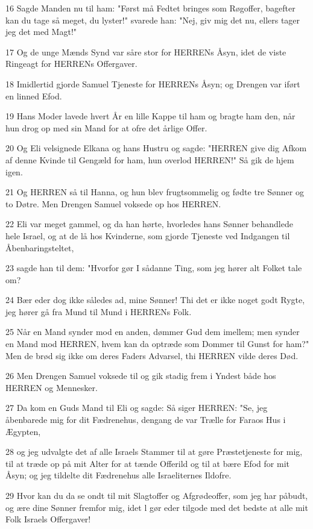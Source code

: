 \par 16 Sagde Manden nu til ham: "Først må Fedtet bringes som Røgoffer, bagefter kan du tage så meget, du lyster!" svarede han: "Nej, giv mig det nu, ellers tager jeg det med Magt!"
\par 17 Og de unge Mænds Synd var såre stor for HERRENs Åsyn, idet de viste Ringeagt for HERRENs Offergaver.
\par 18 Imidlertid gjorde Samuel Tjeneste for HERRENs Åsyn; og Drengen var iført en linned Efod.
\par 19 Hans Moder lavede hvert År en lille Kappe til ham og bragte ham den, når hun drog op med sin Mand for at ofre det årlige Offer.
\par 20 Og Eli velsignede Elkana og hans Hustru og sagde: "HERREN give dig Afkom af denne Kvinde til Gengæld for ham, hun overlod HERREN!" Så gik de hjem igen.
\par 21 Og HERREN så til Hanna, og hun blev frugtsommelig og fødte tre Sønner og to Døtre. Men Drengen Samuel voksede op hos HERREN.
\par 22 Eli var meget gammel, og da han hørte, hvorledes hans Sønner behandlede hele Israel, og at de lå hos Kvinderne, som gjorde Tjeneste ved Indgangen til Åbenbaringsteltet,
\par 23 sagde han til dem: "Hvorfor gør I sådanne Ting, som jeg hører alt Folket tale om?
\par 24 Bær eder dog ikke således ad, mine Sønner! Thi det er ikke noget godt Rygte, jeg hører gå fra Mund til Mund i HERRENs Folk.
\par 25 Når en Mand synder mod en anden, dømmer Gud dem imellem; men synder en Mand mod HERREN, hvem kan da optræde som Dommer til Gunst for ham?" Men de brød sig ikke om deres Faders Advarsel, thi HERREN vilde deres Død.
\par 26 Men Drengen Samuel voksede til og gik stadig frem i Yndest både hos HERREN og Mennesker.
\par 27 Da kom en Guds Mand til Eli og sagde: Så siger HERREN: "Se, jeg åbenbarede mig for dit Fædrenehus, dengang de var Trælle for Faraos Hus i Ægypten,
\par 28 og jeg udvalgte det af alle Israels Stammer til at gøre Præstetjeneste for mig, til at træde op på mit Alter for at tænde Offerild og til at bære Efod for mit Åsyn; og jeg tildelte dit Fædrenehus alle Israeliternes Ildofre.
\par 29 Hvor kan du da se ondt til mit Slagtoffer og Afgrødeoffer, som jeg har påbudt, og ære dine Sønner fremfor mig, idet l gør eder tilgode med det bedste at alle mit Folk Israels Offergaver!
